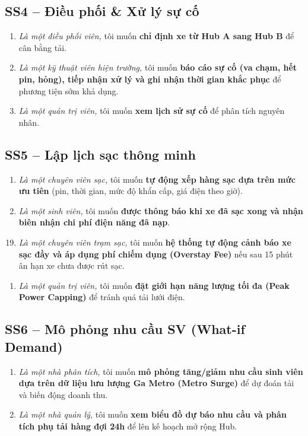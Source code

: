 \documentclass[12pt,a4paper]{report}
\begin{document}
\subsection{SS4 -- Điều phối \& Xử lý sự cố}
\begin{enumerate}[nosep,label=\textbf{US-\arabic*:},start=15]
    \item \textit{Là một điều phối viên,} tôi muốn \textbf{chỉ định xe từ Hub A sang Hub B} để cân bằng tải.
    \item \textit{Là một kỹ thuật viên hiện trường,} tôi muốn \textbf{báo cáo sự cố (va chạm, hết pin, hỏng), tiếp nhận xử lý và ghi nhận thời gian khắc phục} để phương tiện sớm khả dụng.
    \item \textit{Là một quản trị viên,} tôi muốn \textbf{xem lịch sử sự cố} để phân tích nguyên nhân.
\end{enumerate}

\subsection{SS5 -- Lập lịch sạc thông minh}
\begin{enumerate}[nosep,label=\textbf{US-\arabic*:},start=18]
    \item \textit{Là một chuyên viên sạc,} tôi muốn \textbf{tự động xếp hàng sạc dựa trên mức ưu tiên} (pin, thời gian, mức độ khẩn cấp, giá điện theo giờ).
    \item \textit{Là một sinh viên,} tôi muốn \textbf{được thông báo khi xe đã sạc xong và nhận biên nhận chi phí điện năng đã nạp}.
\end{enumerate}
\begin{enumerate}[nosep,label=\textbf{US-\arabic*b:}]
    \setcounter{enumi}{18}
    \item \textit{Là một chuyên viên trạm sạc,} tôi muốn \textbf{hệ thống tự động cảnh báo xe sạc đầy và áp dụng phí chiếm dụng (Overstay Fee)} nếu sau 15 phút ân hạn xe chưa được rút sạc.
\end{enumerate}
\begin{enumerate}[nosep,label=\textbf{US-\arabic*:},start=20]
    \item \textit{Là một quản trị viên,} tôi muốn \textbf{đặt giới hạn năng lượng tối đa (Peak Power Capping)} để tránh quá tải lưới điện.
\end{enumerate}

\subsection{SS6 -- Mô phỏng nhu cầu SV (What-if Demand)}
\begin{enumerate}[nosep,label=\textbf{US-\arabic*:},start=21]
    \item \textit{Là một nhà phân tích,} tôi muốn \textbf{mô phỏng tăng/giảm nhu cầu sinh viên dựa trên dữ liệu lưu lượng Ga Metro (Metro Surge)} để dự đoán tải và biến động doanh thu.
    \item \textit{Là một nhà quản lý,} tôi muốn \textbf{xem biểu đồ dự báo nhu cầu và phân tích phụ tải hàng đợi 24h} để lên kế hoạch mở rộng Hub.
\end{enumerate}
\end{document}
